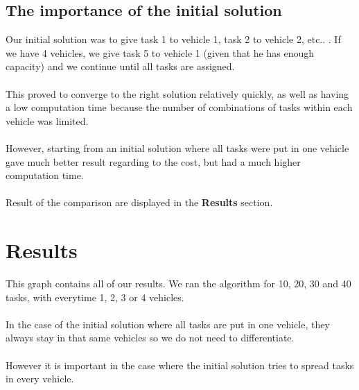 \documentclass[fontsize=12pt]{scrartcl} %
\begin{document}
\subsection*{The importance of the initial solution}
Our initial solution was to give task 1 to vehicle 1, task 2 to vehicle 2, etc.. . If we have 4 vehicles, we give task 5 to vehicle 1 (given that he has enough capacity) and we continue until all tasks are assigned. \\\\
This proved to converge to the right solution relatively quickly, as well as having a low computation time because the number of combinations of tasks within each vehicle was limited. \\\\
However, starting from an initial solution where all tasks were put in one vehicle gave much better result regarding to the cost, but had a much higher computation time. \\ \\
Result of the comparison are displayed in the \textbf{Results} section.


\section*{Results}

This graph contains all of our results. We ran the algorithm for 10, 20, 30 and 40 tasks, with everytime 1, 2, 3 or 4 vehicles. \\ \\
In the case of the initial solution where all tasks are put in one vehicle, they always stay in that same vehicles so we do not need to differentiate. \\\\
However it is important in the case where the initial solution tries to spread tasks in every vehicle.
\end{document}
